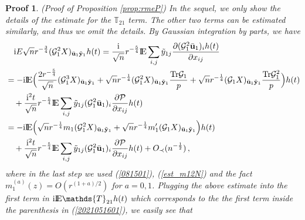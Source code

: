 \documentclass[12pt]{article}
\numberwithin{equation}{section}
\newtheorem{myPro}{Proof}
\theoremstyle{remark}
\newcommand{\1}{{\rm 1}\kern-0.24em{\rm I}}
\newcommand{\E}{{\rm I}\kern-0.18em{\rm E}}
\begin{document}
\begin{appendices}
\begin{myPro}{(Proof of Proposition  \ref{prop:rmeP})}
 In the sequel, we only show the details of the  estimate for the $\mathds{T}_{21}$ term. The other two terms can be estimated similarly, and thus we omit the details. By Gaussian  integration by parts, we have 
\begin{align*}
&\quad \mathrm{i}E \sqrt n r^{-\frac 34}  (\mathcal{G}_1^2{X})_{\bar{\bf u}_1\tilde{{\bf y}}_1} h(t) = \frac{\mathrm{i}}{\sqrt n} r^{-\frac 54} \E\sum_{i,j} \tilde{y}_{1j}  \frac{\partial (\mathcal{G}_1^2\bar{\bf u}_1)_i h(t) }{\partial x_{ij}}\notag\\
 &=-\mathrm{i}\E\Big(  \frac{2r^{-\frac 54}}{\sqrt n} (\mathcal{G}_1^3{X})_{ \bar{\bf u}_1 \tilde{\bf y}_1} + \sqrt n r^{-\frac 14} (\mathcal{G}_1^2{X})_{\bar{\bf u}_1 \tilde{\bf y}_1} \frac{{\rm Tr}\mathcal{G}_1}{p} + \sqrt n r^{-\frac 14} (\mathcal{G}_1{X})_{\bar{\bf u}_1 \tilde{\bf y}_1} \frac{{\rm Tr}\mathcal{G}_1^2}{p}  \Big)h(t)\notag\\
 &\quad +  \frac{\mathrm{i}^2 t}{\sqrt n} r^{-\frac 54}\E\sum_{i,j}  \tilde{y}_{1j}    (\mathcal{G}_1^2 \bar{\bf u}_1)_i
 \frac{\partial \mathcal{P}}{\partial x_{ij}}h(t) \notag\\
 &= -\mathrm{i}\E\Big(  \sqrt n r^{-\frac 14} m_1(\mathcal{G}_1^2{X})_{\bar{\bf u}_1 \tilde{\bf y}_1}  + \sqrt n r^{-\frac 14} m_1' (\mathcal{G}_1{X})_{\bar{\bf u}_1 \tilde{\bf y}_1}   \Big)h(t)\notag\\
&\quad  +  \frac{\mathrm{i}^2 t}{\sqrt n} r^{-\frac 54}\E\sum_{i,j} \tilde{y}_{1j}    (\mathcal{G}_1^2 \bar{\bf u}_1)_i
 \frac{\partial \mathcal{P}}{\partial x_{ij}}h(t) + O_\prec(n^{-\frac 12})\,,
\end{align*}
where in the last step we used (\ref{081501}), (\ref{est_m12N}) and the fact $m_1^{(a)}(z)= O(r^{(1+a)/2})$ for $a=0,1$.  Plugging the above estimate into the first term in $\mathrm{i}\E\mathds{T}_{21}h(t)$ which corresponds to the the first term inside the parenthesis in (\ref{2021051601}), we easily see that 
\begin{align*}

\end{align*}
\end{myPro}
\end{appendices}
\end{document}

